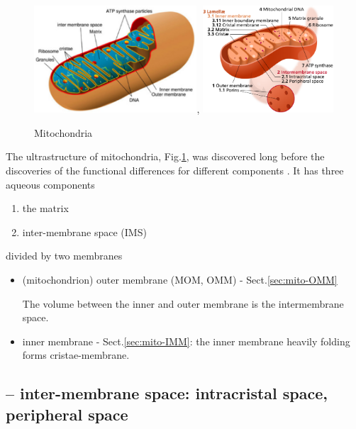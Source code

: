 \begin{figure}[hbt]
  \centerline{\includegraphics[height=4cm,
    angle=0]{./images/mitochondria.eps},
    \includegraphics[height=4cm,
    angle=0]{./images/mitochondria2.eps}}
\caption{Mitochondria}
\label{fig:mitochondria}
\end{figure}

The ultrastructure of mitochondria, Fig.\ref{fig:mitochondria}, was discovered
long before the discoveries of the functional differences for different
components \citep{munn1974}.
It has three aqueous components
\begin{enumerate}

  \item the matrix


  \item inter-membrane space (IMS)

\end{enumerate}
divided by two membranes
\begin{itemize}
  \item (mitochondrion) outer membrane (MOM, OMM) - Sect.\ref{sec:mito-OMM}

The volume between the inner and outer membrane is the
intermembrane space.

  \item inner membrane - Sect.\ref{sec:mito-IMM}: the inner membrane heavily
  folding forms cristae-membrane.

\end{itemize}

\subsection{-- inter-membrane space: intracristal space, peripheral space}


